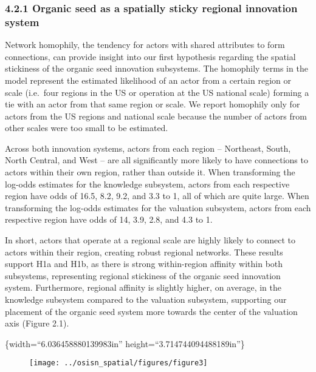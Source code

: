 \documentclass[twoside,12pt,final]{ucthesis-CA2012}
\begin{document}
\begin{ucmainmatter}
\hypertarget{organic-seed-as-a-spatially-sticky-regional-innovation-system}{%
\subsubsection{4.2.1 Organic seed as a spatially sticky regional innovation system}\label{organic-seed-as-a-spatially-sticky-regional-innovation-system}}

Network \textquotesingle homophily\textquotesingle, the tendency for actors with shared attributes to
form connections, can provide insight into our first hypothesis
regarding the spatial stickiness of the organic seed innovation
subsystems. The homophily terms in the model represent the estimated
likelihood of an actor from a certain region or scale (i.e.~four regions
in the US or operation at the US national scale) forming a tie with an
actor from that same region or scale. We report homophily only for
actors from the US regions and national scale because the number of
actors from other scales were too small to be estimated.

Across both innovation systems, actors from each region -- Northeast,
South, North Central, and West -- are all significantly more likely to
have connections to actors within their own region, rather than outside
it. When transforming the log-odds estimates for the knowledge
subsystem, actors from each respective region have odds of 16.5, 8.2,
9.2, and 3.3 to 1, all of which are quite large. When transforming the
log-odds estimates for the valuation subsystem, actors from each
respective region have odds of 14, 3.9, 2.8, and 4.3 to 1.

In short, actors that operate at a regional scale are highly likely to
connect to actors within their region, creating robust regional
networks. These results support H1a and H1b, as there is strong
within-region affinity within both subsystems, representing regional
stickiness of the organic seed innovation system. Furthermore, regional
affinity is slightly higher, on average, in the knowledge subsystem
compared to the valuation subsystem, supporting our placement of the
organic seed system more towards the center of the valuation axis
(Figure 2.1).

\{width=``6.036458880139983in''
height=``3.714744094488189in''\}
\begin{figure}

{\centering \texttt{[image: ../osisn\_spatial/figures/figure3]} 

}


\end{figure}
\end{ucmainmatter}
\end{document}
